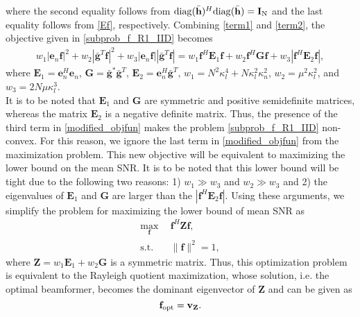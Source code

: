 \documentclass[journal,draftclsnofoot,onecolumn,12pt]{IEEEtran}
\begin{document}
where  the second equality follows from  ${\rm diag}(\bar{\mathbf{h}})^H{\rm diag}(\bar{\mathbf{h}})=\mathbf{I}_{\rm N}$ and the last equality follows from \eqref{Ef}, respectively. Combining \eqref{term1} and \eqref{term2}, the objective given in \eqref{subprob_f_R1_IID} becomes
\begin{align}
w_1|\mathbf{e}_n\mathbf{f}|^2+w_2|\bar{\mathbf{g}}^T\mathbf{f}|^2+w_3|\mathbf{e}_n\mathbf{f}||\bar{\mathbf{g}}^T\mathbf{f}| = 
w_1\mathbf{f}^H\mathbf{E}_1\mathbf{f}+w_2\mathbf{f}^H\mathbf{Gf}+w_3|\mathbf{f}^H\mathbf{E}_2\mathbf{f}|,\label{modified_objfun}
\end{align} 
 where $\mathbf{E}_1=\mathbf{e}_n^H\mathbf{e}_n$, $\mathbf{G}=\bar{\mathbf{g}}^*\bar{\mathbf{g}}^T$, $\mathbf{E}_2=\mathbf{e}_n^H\bar{\mathbf{g}}^T$,  $w_1=N^2\kappa_l^4+N\kappa_l^2\kappa_n^2$, $w_2=\mu^2\kappa_l^2$, and $w_3=2N\mu\kappa_l^3$.\\
 It is to be noted that $\mathbf{E}_1$ and $\mathbf{G}$ are  symmetric and positive semidefinite matrices, whereas the matrix $\mathbf{E}_2$ is a negative definite matrix. Thus, the presence of the third term in \eqref{modified_objfun} makes the problem \eqref{subprob_f_R1_IID} non-convex. For this reason, we ignore the last term in \eqref{modified_objfun} from the maximization problem. This new objective will be equivalent to maximizing the lower bound on the mean {\rm SNR}.  It  is to be noted that this lower bound will be tight due to the following two reasons: 1) $w_1 \gg w_3$ and $w_2 \gg w_3$ and 2) the eigenvalues of  $\mathbf{E}_1$ and $\mathbf{G}$ are larger than the  $|\mathbf{f}^H\mathbf{E}_2\mathbf{f}|$. 
Using these arguments, we simplify the   problem for  maximizing the lower bound of mean {\rm SNR} as 
\vspace{-0.2cm}
\begin{align}
    \max_{\mathbf{f}} ~~& \mathbf{f}^H\mathbf{Zf},\\
   \text{s.t.} ~~& \|\mathbf{f}\|^2 = 1,
\end{align}
where  $\mathbf{Z}=w_1\mathbf{E}_1+w_2\mathbf{G}$ is a symmetric matrix. Thus, this optimization problem is equivalent to the Rayleigh quotient maximization, whose solution, i.e. the optimal beamformer,  becomes the dominant eigenvector of $\mathbf{Z}$ and can be given as 
\vspace{-0.3cm}
\begin{equation}
    \mathbf{f}_{\rm opt} = \mathbf{v_Z}.\label{OptSol_f_R1_iid}
\end{equation}
\end{document}
